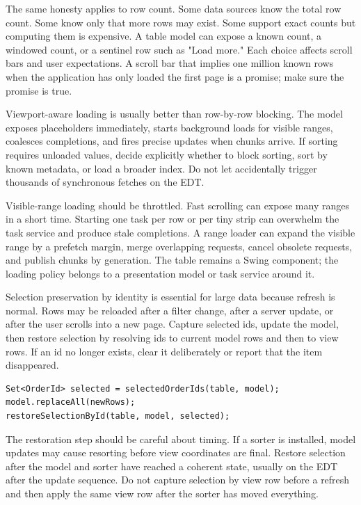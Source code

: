 The same honesty applies to row count. Some data sources know the total row count. Some know only that more rows may exist. Some support exact counts but computing them is expensive. A table model can expose a known count, a windowed count, or a sentinel row such as "Load more." Each choice affects scroll bars and user expectations. A scroll bar that implies one million known rows when the application has only loaded the first page is a promise; make sure the promise is true.

Viewport-aware loading is usually better than row-by-row blocking. The model exposes placeholders immediately, starts background loads for visible ranges, coalesces completions, and fires precise updates when chunks arrive. If sorting requires unloaded values, decide explicitly whether to block sorting, sort by known metadata, or load a broader index. Do not let  accidentally trigger thousands of synchronous fetches on the EDT.

Visible-range loading should be throttled. Fast scrolling can expose many ranges in a short time. Starting one task per row or per tiny strip can overwhelm the task service and produce stale completions. A range loader can expand the visible range by a prefetch margin, merge overlapping requests, cancel obsolete requests, and publish chunks by generation. The table remains a Swing component; the loading policy belongs to a presentation model or task service around it.

Selection preservation by identity is essential for large data because refresh is normal. Rows may be reloaded after a filter change, after a server update, or after the user scrolls into a new page. Capture selected ids, update the model, then restore selection by resolving ids to current model rows and then to view rows. If an id no longer exists, clear it deliberately or report that the item disappeared.

\begin{lstlisting}[caption={Preserving selection by stable domain identity.}]
Set<OrderId> selected = selectedOrderIds(table, model);
model.replaceAll(newRows);
restoreSelectionById(table, model, selected);
\end{lstlisting}

The restoration step should be careful about timing. If a sorter is installed, model updates may cause resorting before view coordinates are final. Restore selection after the model and sorter have reached a coherent state, usually on the EDT after the update sequence. Do not capture selection by view row before a refresh and then apply the same view row after the sorter has moved everything.

